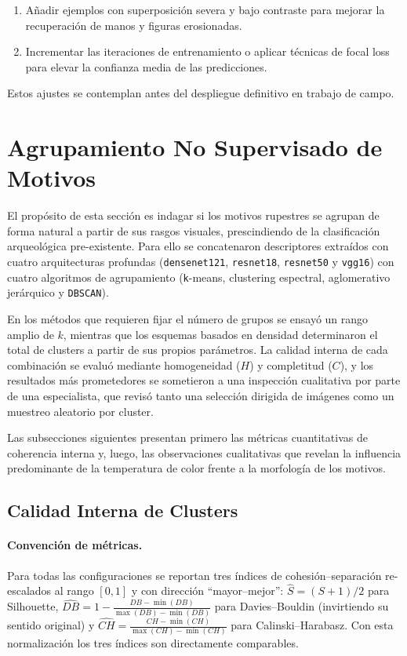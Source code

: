 \begin{enumerate}
  \item Añadir ejemplos con superposición severa y bajo contraste para mejorar la recuperación de manos y figuras erosionadas.
  \item Incrementar las iteraciones de entrenamiento o aplicar técnicas de focal loss para elevar la confianza media de las predicciones.
\end{enumerate}
Estos ajustes se contemplan antes del despliegue definitivo en trabajo de campo.

\section{Agrupamiento No Supervisado de Motivos}

El propósito de esta sección es indagar si los motivos rupestres se agrupan de forma natural a partir de sus rasgos visuales, prescindiendo de la clasificación arqueológica pre-existente.
Para ello se concatenaron descriptores extraídos con cuatro arquitecturas profundas (\texttt{densenet121}, \texttt{resnet18}, \texttt{resnet50} y \texttt{vgg16}) con cuatro algoritmos de agrupamiento (\texttt{k}-means, clustering espectral, aglomerativo jerárquico y \texttt{DBSCAN}).

En los métodos que requieren fijar el número de grupos se ensayó un rango amplio de $k$, mientras que los esquemas basados en densidad determinaron el total de clusters a partir de sus propios parámetros.
La calidad interna de cada combinación se evaluó mediante homogeneidad ($H$) y completitud ($C$), y los resultados más prometedores se sometieron a una inspección cualitativa por parte de una especialista, que revisó tanto una selección dirigida de imágenes como un muestreo aleatorio por cluster.

Las subsecciones siguientes presentan primero las métricas cuantitativas de coherencia interna y, luego, las observaciones cualitativas que revelan la influencia predominante de la temperatura de color frente a la morfología de los motivos.

\subsection{Calidad Interna de Clusters}

\paragraph{Convención de métricas.}
Para todas las configuraciones se reportan tres índices de cohesión–separación
re-escalados al rango \([0,1]\) y con dirección “mayor–mejor”:
\(\widehat S=(S+1)/2\) para Silhouette,
\(\widehat{DB}=1-\frac{DB-\min(DB)}{\max(DB)-\min(DB)}\) para Davies–Bouldin
(invirtiendo su sentido original) y
\(\widehat{CH}=\frac{CH-\min(CH)}{\max(CH)-\min(CH)}\) para Calinski–Harabasz.
Con esta normalización los tres índices son directamente comparables.

